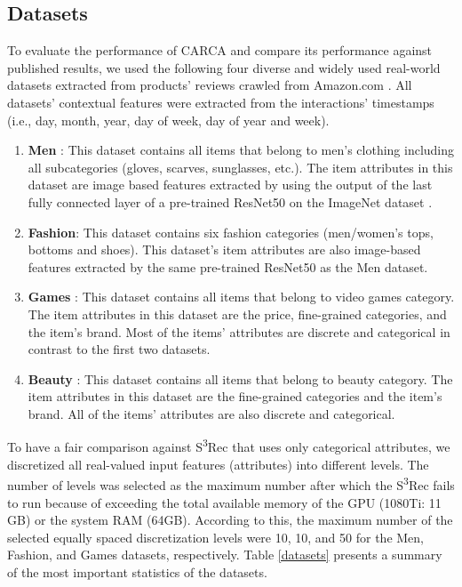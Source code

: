 \documentclass[sigconf,natbib=true]{acmart}
\begin{document}
\subsection{Datasets}
To evaluate the performance of CARCA and compare its performance against published results, we used the following four diverse and widely used real-world datasets extracted from products' reviews crawled from Amazon.com \cite{kang2018self,wu2020sse,steck2019embarrassingly,ZhouWZZWZWW20,he2016vbpr,ijcai2019650}. All datasets' contextual features were extracted from the interactions' timestamps (i.e., day, month, year, day of week, day of year and week). 
\begin{enumerate}
    \item \textbf{Men} \cite{he2016vbpr}: This dataset contains all items that belong to men’s clothing including all subcategories (gloves, scarves, sunglasses, etc.). The item attributes in this dataset are image based features extracted by using the output of the last fully connected layer of a pre-trained ResNet50 \cite{he2016deep} on the ImageNet dataset \cite{imagenet_cvpr09}.
    
    \item \textbf{Fashion}\cite{ijcai2019650,he2016vbpr}: This dataset contains six fashion categories (men/women’s tops, bottoms and shoes). This dataset's item attributes are also image-based features extracted by the same pre-trained ResNet50 as the Men dataset.
    
    \item \textbf{Games} \cite{kang2018self,wu2020sse}: This dataset contains all items that belong to video games category. The item attributes in this dataset are the price, fine-grained categories, and the item's brand. Most of the items' attributes are discrete and categorical in contrast to the first two datasets. 

    \item \textbf{Beauty} \cite{kang2018self,wu2020sse,ZhouWZZWZWW20}: This dataset contains all items that belong to beauty category. The item attributes in this dataset are the fine-grained categories and the item's brand. All of the items' attributes are also discrete and categorical. 
     
\end{enumerate}

To have a fair comparison against S\textsuperscript{3}Rec \cite{ZhouWZZWZWW20} that uses only categorical attributes, we discretized all real-valued input features (attributes) into different levels. The number of levels was selected as the maximum number after which the S\textsuperscript{3}Rec fails to run because of exceeding the total available memory of the GPU (1080Ti: 11 GB) or the system RAM (64GB). According to this, the maximum number of the selected equally spaced discretization levels were 10, 10, and 50 for the Men, Fashion, and Games datasets, respectively. 
Table \ref{datasets} presents a summary of the most important statistics of the datasets.
\end{document}

